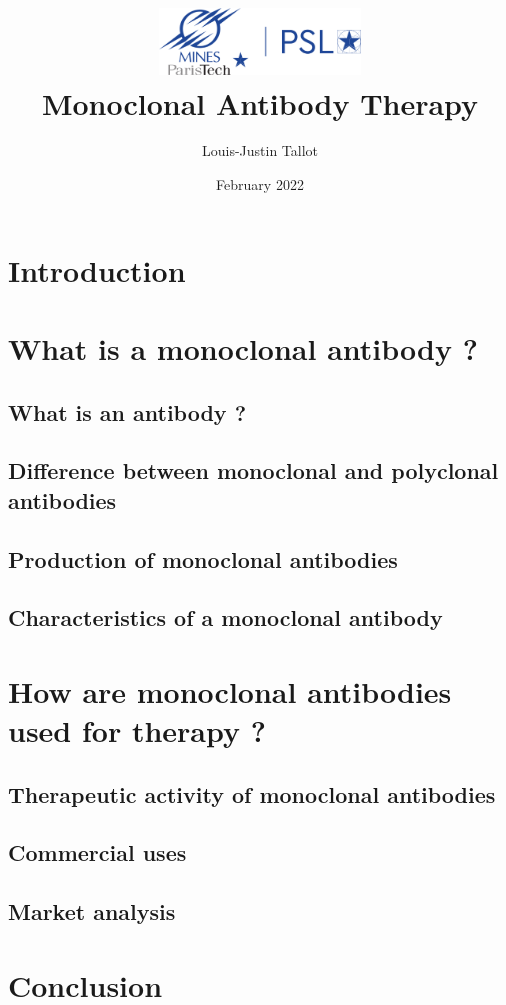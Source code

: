 \documentclass{article}
\title{
  \includegraphics[width=0.4\textwidth]{../Images/Logo_Mines_ParisTech.png}\\
  \vspace{1em}
  \textbf{Monoclonal Antibody Therapy}
}
\author{Louis-Justin Tallot}
\date{February 2022}
\begin{document}
  \maketitle

  \section*{Introduction}
  

  \section{What is a monoclonal antibody ?}

    \subsection{What is an antibody ?}
    

    \subsection{Difference between monoclonal and polyclonal antibodies}
    

    \subsection{Production of monoclonal antibodies}
    \label{sec:monoclonal_antibody_production}
    

    \subsection{Characteristics of a monoclonal antibody}
    

  \section{How are monoclonal antibodies used for therapy ?}

    \subsection{Therapeutic activity of monoclonal antibodies}
    

    \subsection{Commercial uses}
    

    \subsection{Market analysis}
    
  
  \section*{Conclusion}


  \printbibliography

  \listoffigures
\end{document}
